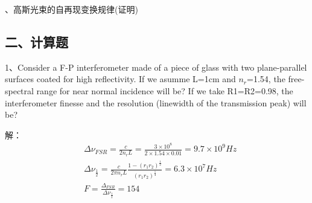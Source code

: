 \documentclass[12pt]{article}
\begin{document}
{、高斯光束的自再现变换规律(证明)
}
\newpage



\subsection*{二、计算题}
1、Consider a F-P interferometer made of a piece of glass with two
plane-parallel surfaces coated for high reflectivity. If we asumme L=1cm
and $n_r$=1.54, the free-spectral range for near normal incidence will be? If
we take R1=R2=0.98, the interferometer finesse and the resolution
(linewidth of the transmission peak) will be?
\par 解：
	\begin{align*}
		&\Delta\nu_{FSR}=\frac{c}{2n_r L} = \frac{3\times10^8}{2\times1.54\times0.01} = 9.7\times10^9 \si{Hz}
	  \\& \Delta\nu_{\frac{1}{2} }=\frac{c}{2\pi n_r L} \frac{1-(r_1r_2)^{\frac{1}{2} }}{(r_1r_2)^{\frac{1}{4} }} =6.3\times 10^7 \si{Hz}
	  \\& F=\frac{\Delta_{FSR}}{\Delta\nu_{\frac{1}{2} }} =154
	\end{align*}
\end{document}
